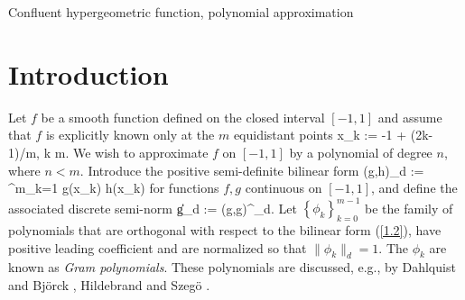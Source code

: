 \begin{abstract}
Let $\left\{\phi_{k}\right\}^{n}_{k=0}$, $n<m$, be a family of polynomials
orthogonal with respect to the positive semi-definite bilinear form
$$
(g,h)_{d}:=\frac{1}{m}\sum^{m}_{j=1}g(x_{j})h(x_{j}),\qquad
x_{j}:=-1+(2j-1)/m.
$$
These polynomials are known as Gram polynomials. The present paper
investigates the growth of $|\phi_{k}(x)|$ as a function of $k$ and $m$
for fixed $x\in [-1,1]$. We show that when $n\leq 2.5m^{1/2}$, the
polynomials in the family $\left\{\phi_{k} \right\}^{n}_{k=0}$ are of
modest size on $[-1,1]$, and they are therefore well suited for the
approximation of functions on this interval. We also demonstrate
that if the degree $k$ is close to $m$, and $m \geq 10$, then $\phi_{k}(x)$
oscillates with large amplitude for values of $x$ near the endpoints of
$[-1,1]$, and this behavior makes $\phi_k$ poorly suited for the
approximation of functions on $[-1,1]$. We study the growth properties
of $|\phi_{k}(x)|$ by deriving a second order differential equation,
one solution of which exposes the growth. The
connection between Gram polynomials and this solution to the differential
equation suggested what became a long-standing conjectured inequality for
the confluent hypergeometric function ${}_1F_1$, also known as Kummer's
function, i.e., that
${}_1F_1((1-a)/2,1,t^2)\leq {}_1F_1(1/2,1,t^2)$ for all $a\geq 0$.
In this paper we completely resolve this conjecture by verifying a
generalization of the conjectured inequality with sharp constants.
\end{abstract}

\keywords
Confluent hypergeometric function, polynomial approximation
\endkeywords



\section{Introduction}

Let $f$ be a smooth function defined on the closed interval $[-1,1]$
and assume that $f$ is explicitly known only at the $m$ equidistant
points
\be\label{nodes}
x_{k} := -1 + (2k-1)/m, \leq k \leq m.
\ee
We wish to approximate $f$ on $[-1,1]$ by a polynomial of degree $n$,
where $n < m$. Introduce the positive semi-definite bilinear form
\be \label{1.2}
(g,h)_{d} :=  \dis\sum^{m}_{k=1} g(x_{k}) h(x_{k})
\ee
for functions $f,g$ continuous on $[-1,1]$, and define the associated discrete
semi-norm
\be \label{1.1}
\|g\|_{d} := (g,g)^{}_{d}.
\ee
Let $\left\{\phi_{k} \right\}^{m-1}_{k=0}$ be the family of polynomials
that are orthogonal with respect to the bilinear form (\ref{1.2}), have
positive leading coefficient and are normalized so that
$\|\phi_{k}\|_d=1$. The $\phi_{k}$ are known as {\em Gram polynomials}.
These polynomials are discussed, e.g., by Dahlquist and Bj\"{o}rck
\cite[Section 4.4.4]{5}, Hildebrand \cite[Sections 7.13 and 7.16]{Hi} and
Szeg\"{o} \cite[Section 2.8]{14}.


